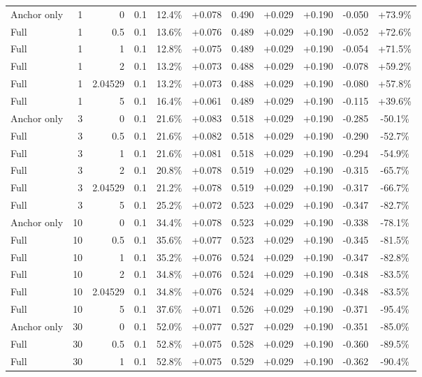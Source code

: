 \begin{table}[htbp]
\begin{tabular}{lrrrccccccc}
Anchor only & 1 & 0 & 0.1 & 12.4\% & +0.078 & 0.490 & +0.029 & +0.190 & -0.050 & +73.9\% \\
Full & 1 & 0.5 & 0.1 & 13.6\% & +0.076 & 0.489 & +0.029 & +0.190 & -0.052 & +72.6\% \\
Full & 1 & 1 & 0.1 & 12.8\% & +0.075 & 0.489 & +0.029 & +0.190 & -0.054 & +71.5\% \\
Full & 1 & 2 & 0.1 & 13.2\% & +0.073 & 0.488 & +0.029 & +0.190 & -0.078 & +59.2\% \\
Full & 1 & 2.04529 & 0.1 & 13.2\% & +0.073 & 0.488 & +0.029 & +0.190 & -0.080 & +57.8\% \\
Full & 1 & 5 & 0.1 & 16.4\% & +0.061 & 0.489 & +0.029 & +0.190 & -0.115 & +39.6\% \\
Anchor only & 3 & 0 & 0.1 & 21.6\% & +0.083 & 0.518 & +0.029 & +0.190 & -0.285 & -50.1\% \\
Full & 3 & 0.5 & 0.1 & 21.6\% & +0.082 & 0.518 & +0.029 & +0.190 & -0.290 & -52.7\% \\
Full & 3 & 1 & 0.1 & 21.6\% & +0.081 & 0.518 & +0.029 & +0.190 & -0.294 & -54.9\% \\
Full & 3 & 2 & 0.1 & 20.8\% & +0.078 & 0.519 & +0.029 & +0.190 & -0.315 & -65.7\% \\
Full & 3 & 2.04529 & 0.1 & 21.2\% & +0.078 & 0.519 & +0.029 & +0.190 & -0.317 & -66.7\% \\
Full & 3 & 5 & 0.1 & 25.2\% & +0.072 & 0.523 & +0.029 & +0.190 & -0.347 & -82.7\% \\
Anchor only & 10 & 0 & 0.1 & 34.4\% & +0.078 & 0.523 & +0.029 & +0.190 & -0.338 & -78.1\% \\
Full & 10 & 0.5 & 0.1 & 35.6\% & +0.077 & 0.523 & +0.029 & +0.190 & -0.345 & -81.5\% \\
Full & 10 & 1 & 0.1 & 35.2\% & +0.076 & 0.524 & +0.029 & +0.190 & -0.347 & -82.8\% \\
Full & 10 & 2 & 0.1 & 34.8\% & +0.076 & 0.524 & +0.029 & +0.190 & -0.348 & -83.5\% \\
Full & 10 & 2.04529 & 0.1 & 34.8\% & +0.076 & 0.524 & +0.029 & +0.190 & -0.348 & -83.5\% \\
Full & 10 & 5 & 0.1 & 37.6\% & +0.071 & 0.526 & +0.029 & +0.190 & -0.371 & -95.4\% \\
Anchor only & 30 & 0 & 0.1 & 52.0\% & +0.077 & 0.527 & +0.029 & +0.190 & -0.351 & -85.0\% \\
Full & 30 & 0.5 & 0.1 & 52.8\% & +0.075 & 0.528 & +0.029 & +0.190 & -0.360 & -89.5\% \\
Full & 30 & 1 & 0.1 & 52.8\% & +0.075 & 0.529 & +0.029 & +0.190 & -0.362 & -90.4\% \\

\end{tabular}
\end{table}
